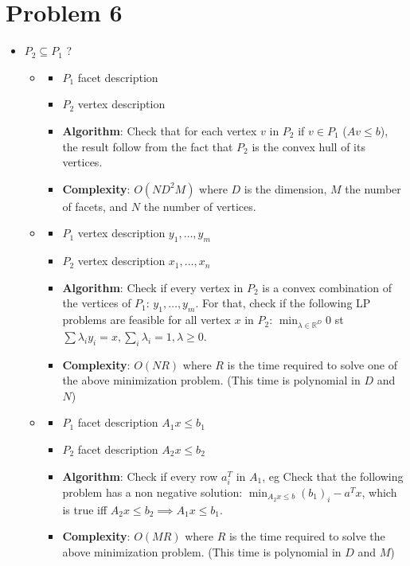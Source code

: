 \documentclass[11pt]{article}
\begin{document}
\section{Problem 6}
\label{sec:orgheadline7}
\begin{itemize}
\item \(P_2 \subseteq P_1\) ?
\begin{itemize}
\item \begin{itemize}
\item \(P_1\) facet description
\item \(P_2\) vertex description
\item \textbf{Algorithm}: Check that for each vertex \(v\) in \(P_2\) if \(v \in P_1\) (\(Av \le b\)), the result follow from the fact that \(P_2\) is the convex hull of its vertices.

\item \textbf{Complexity}: \(O(N D^2M)\) where \(D\) is the dimension, \(M\) the number of facets, and \(N\) the number of vertices.
\end{itemize}

\item \begin{itemize}
\item \(P_1\) vertex description \(y_1, \ldots, y_m\)
\item \(P_2\) vertex description \(x_1, \ldots, x_n\)
\item \textbf{Algorithm}: Check if every vertex in \(P_2\) is a convex combination of the vertices of \(P_1\): \(y_1, \ldots, y_m\). For that, check if the following LP problems are feasible for all vertex \(x\) in \(P_2\):  \(\min_{\lambda \in \mathbb{R}^D} 0\) st \(\sum \lambda_i y_i = x, \sum_i \lambda_i = 1, \lambda \ge 0\).
\item \textbf{Complexity}: \(O(N R)\) where \(R\) is the time required to solve one of the above minimization problem. (This time is polynomial in \(D\) and \(N\))
\end{itemize}

\item \begin{itemize}
\item \(P_1\) facet description \(A_1x \le b_1\)
\item \(P_2\) facet description \(A_2x \le b_2\)
\item \textbf{Algorithm}: Check if every row  \(a_i^T\) in \(A_1\), eg Check that the following problem has a non negative solution:
\(\min_{A_2x \le b} (b_1)_i - a^T x\), which is true iff \(A_2x \le b_2 \implies A_1x \le b_1\).
\item \textbf{Complexity}: \(O(M R)\) where \(R\) is the time required to solve the above minimization problem. (This time is polynomial in \(D\) and \(M\))
\end{itemize}
\end{itemize}
\end{itemize}
\end{document}
